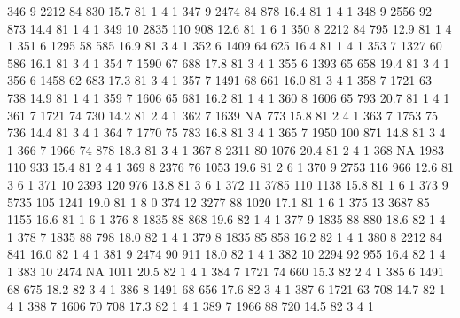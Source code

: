 \documentclass{article}
\begin{document}
\begin{Schunk}
\begin{Soutput}
346       9  2212  84  830 15.7  81      1       4        1
347       9  2474  84  878 16.4  81      1       4        1
348       9  2556  92  873 14.4  81      1       4        1
349      10  2835 110  908 12.6  81      1       6        1
350       8  2212  84  795 12.9  81      1       4        1
351       6  1295  58  585 16.9  81      3       4        1
352       6  1409  64  625 16.4  81      1       4        1
353       7  1327  60  586 16.1  81      3       4        1
354       7  1590  67  688 17.8  81      3       4        1
355       6  1393  65  658 19.4  81      3       4        1
356       6  1458  62  683 17.3  81      3       4        1
357       7  1491  68  661 16.0  81      3       4        1
358       7  1721  63  738 14.9  81      1       4        1
359       7  1606  65  681 16.2  81      1       4        1
360       8  1606  65  793 20.7  81      1       4        1
361       7  1721  74  730 14.2  81      2       4        1
362       7  1639  NA  773 15.8  81      2       4        1
363       7  1753  75  736 14.4  81      3       4        1
364       7  1770  75  783 16.8  81      3       4        1
365       7  1950 100  871 14.8  81      3       4        1
366       7  1966  74  878 18.3  81      3       4        1
367       8  2311  80 1076 20.4  81      2       4        1
368      NA  1983 110  933 15.4  81      2       4        1
369       8  2376  76 1053 19.6  81      2       6        1
370       9  2753 116  966 12.6  81      3       6        1
371      10  2393 120  976 13.8  81      3       6        1
372      11  3785 110 1138 15.8  81      1       6        1
373       9  5735 105 1241 19.0  81      1       8        0
374      12  3277  88 1020 17.1  81      1       6        1
375      13  3687  85 1155 16.6  81      1       6        1
376       8  1835  88  868 19.6  82      1       4        1
377       9  1835  88  880 18.6  82      1       4        1
378       7  1835  88  798 18.0  82      1       4        1
379       8  1835  85  858 16.2  82      1       4        1
380       8  2212  84  841 16.0  82      1       4        1
381       9  2474  90  911 18.0  82      1       4        1
382      10  2294  92  955 16.4  82      1       4        1
383      10  2474  NA 1011 20.5  82      1       4        1
384       7  1721  74  660 15.3  82      2       4        1
385       6  1491  68  675 18.2  82      3       4        1
386       8  1491  68  656 17.6  82      3       4        1
387       6  1721  63  708 14.7  82      1       4        1
388       7  1606  70  708 17.3  82      1       4        1
389       7  1966  88  720 14.5  82      3       4        1

\end{Soutput}
\end{Schunk}
\end{document}
